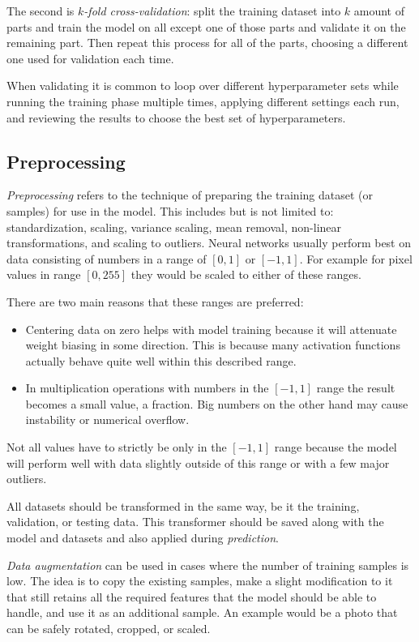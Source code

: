 \documentclass[a4paper]{report}
\begin{document}
The second is \emph{$k$-fold cross-validation}: split the training dataset into $k$ amount of parts and train the model on all except one of those parts and validate it on the remaining part. Then repeat this process for all of the parts, choosing a different one used for validation each time.

When validating it is common to loop over different hyperparameter sets while running the training phase multiple times, applying different settings each run, and reviewing the results to choose the best set of hyperparameters.

\subsection*{Preprocessing}
\emph{Preprocessing} refers to the technique of preparing the training dataset (or samples) for use in the model. This includes but is not limited to: standardization, scaling, variance scaling, mean removal, non-linear transformations, and scaling to outliers. Neural networks usually perform best on data consisting of numbers in a range of $[0,1]$ or $[-1,1]$. For example for pixel values in range $[0,255]$ they would be scaled to either of these ranges.

There are two main reasons that these ranges are preferred:

\begin{itemize}
    \item Centering data on zero helps with model training because it will attenuate weight biasing in some direction. This is because many activation functions actually behave quite well within this described range. 
    \item In multiplication operations with numbers in the $[-1,1]$ range the result becomes a small value, a fraction. Big numbers on the other hand may cause instability or numerical overflow.
\end{itemize}

Not all values have to strictly be only in the $[-1,1]$ range because the model will perform well with data slightly outside of this range or with a few major outliers.

All datasets should be transformed in the same way, be it the training, validation, or testing data. This transformer should be saved along with the model and datasets and also applied during \emph{prediction}.

\emph{Data augmentation} can be used in cases where the number of training samples is low. The idea is to copy the existing samples, make a slight modification to it that still retains all the required features that the model should be able to handle, and use it as an additional sample. An example would be a photo that can be safely rotated, cropped, or scaled.
\end{document}
